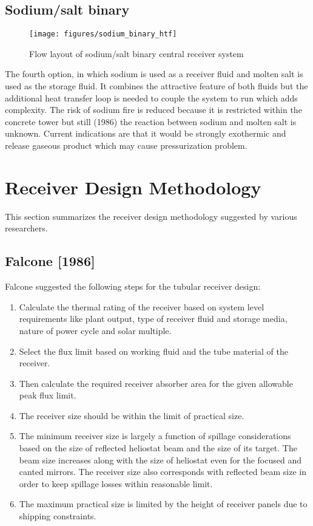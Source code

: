 \subsection{Sodium/salt binary}
\begin{figure}[h!]
	\texttt{[image: figures/sodium\_binary\_htf]}
	\centering
	\caption{Flow layout of sodium/salt binary central receiver system}
\end{figure}
The fourth option, in which sodium is used as a receiver fluid and molten salt is used as the storage fluid. It combines the attractive feature of both fluids but the additional heat transfer loop is needed to couple the system to run which adds complexity. The risk of sodium fire is reduced because it is restricted within the concrete tower but still (1986) the reaction between sodium and molten salt is unknown. Current indications are that it would be strongly exothermic and release gaseous product which may cause pressurization problem.

\section{Receiver Design Methodology}
This section summarizes the receiver design methodology suggested by various researchers.

\subsection{Falcone [1986]}
Falcone\cite{Falcone.1986} suggested the following steps for the tubular receiver design: 
\begin{enumerate}
	\item Calculate the thermal rating of the receiver based on system level requirements like plant output, type of receiver fluid and storage media, nature of power cycle and solar multiple.
	\item Select the flux limit based on working fluid and the tube material of the receiver.
	\item Then calculate the required receiver absorber area for the given allowable peak flux limit.
	\item The receiver size should be within the limit of practical size.
	\item The minimum receiver size is largely a function of spillage considerations based on the size of reflected heliostat beam and the size of its target. The beam size increases along with the size of heliostat even for the focused and canted mirrors. The receiver size also corresponds with reflected beam size in order to keep spillage losses within reasonable limit.
	\item The maximum practical size is limited by the height of receiver panels due to shipping constraints.
\end{enumerate}
